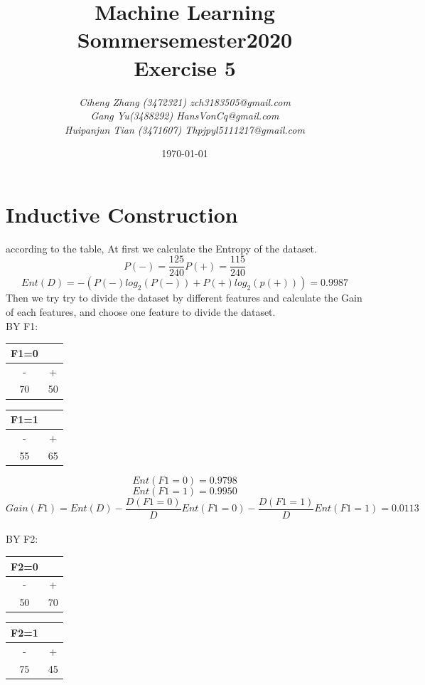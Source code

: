 \documentclass{article}
\begin{document}
\begin{titlepage}
    \title{\Huge \textbf{Machine Learning\\Sommersemester2020\\Exercise 5} }
    \author{\LARGE \textsl{Ciheng Zhang (3472321) zch3183505@gmail.com}\\\LARGE \textsl{Gang Yu(3488292) HansVonCq@gmail.com}\\\LARGE \textsl{Huipanjun Tian (3471607)  Thpjpyl5111217@gmail.com} \\[200pt]}
    \date{\today}
    \maketitle
    \thispagestyle{empty}
\end{titlepage}
\newpage
\section{Inductive Construction}
according to the table, At first we calculate the Entropy of the dataset.
\[P(-)=\frac{125}{240} P(+)=\frac{115}{240}\]
\[Ent(D)=-(P(-)log_2(P(-))+P(+)log_2(p(+)))=0.9987\]
Then we try try to divide the dataset by different features and calculate the Gain of each features, and choose one feature to divide the dataset.
\\BY F1:\\
\begin{center}
    \begin{tabular}{cc}
    F1=0\\
    \hline
    -&+\\
    \hline
    70&50\\
    \hline
\end{tabular}
\begin{tabular}{cc}
    F1=1\\
    \hline
    -&+\\
    \hline
    55&65\\
    \hline
\end{tabular}
\end{center}
\[Ent(F1=0)=0.9798\]
\[Ent(F1=1)=0.9950\]
\[Gain(F1)=Ent(D)-\frac{D(F1=0)}{D}Ent(F1=0)-\frac{D(F1=1)}{D}Ent(F1=1)=0.0113\]
\\BY F2:\\
\begin{center}
    \begin{tabular}{cc}
    F2=0\\
    \hline
    -&+\\
    \hline
    50&70\\
    \hline
\end{tabular}
\begin{tabular}{cc}
    F2=1\\
    \hline
    -&+\\
    \hline
    75&45\\
    \hline
\end{tabular}
\end{center}
\end{document}
